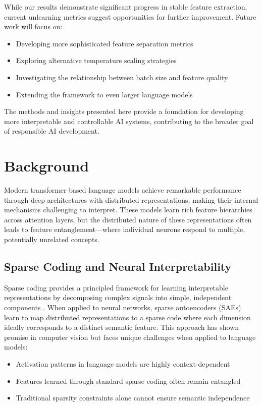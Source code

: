 \documentclass{article} %
\begin{document}
While our results demonstrate significant progress in stable feature extraction, current unlearning metrics suggest opportunities for further improvement. Future work will focus on:
\begin{itemize}
    \item Developing more sophisticated feature separation metrics
    \item Exploring alternative temperature scaling strategies
    \item Investigating the relationship between batch size and feature quality
    \item Extending the framework to even larger language models
\end{itemize}

The methods and insights presented here provide a foundation for developing more interpretable and controllable AI systems, contributing to the broader goal of responsible AI development.

\section{Background}
\label{sec:background}

Modern transformer-based language models \cite{vaswani2017attention} achieve remarkable performance through deep architectures with distributed representations, making their internal mechanisms challenging to interpret. These models learn rich feature hierarchies across attention layers, but the distributed nature of these representations often leads to feature entanglement—where individual neurons respond to multiple, potentially unrelated concepts.

\subsection{Sparse Coding and Neural Interpretability}
Sparse coding provides a principled framework for learning interpretable representations by decomposing complex signals into simple, independent components \cite{goodfellow2016deep}. When applied to neural networks, sparse autoencoders (SAEs) learn to map distributed representations to a sparse code where each dimension ideally corresponds to a distinct semantic feature. This approach has shown promise in computer vision but faces unique challenges when applied to language models:

\begin{itemize}
    \item Activation patterns in language models are highly context-dependent
    \item Features learned through standard sparse coding often remain entangled
    \item Traditional sparsity constraints alone cannot ensure semantic independence
\end{itemize}
\end{document}

